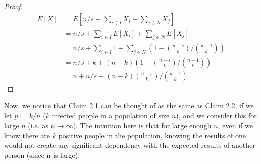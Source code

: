 \documentclass[12pt]{article}
\begin{document}
\begin{proof}
\begin{align*}
E[X]&=E[n/s + \sum\limits_{i \in I}^{}X_i + \sum\limits_{j \in N}^{}X_j] \\
    &= n/s + \sum\limits_{i \in I}^{}E[X_i] + \sum\limits_{j \in N}^{}E[X_j] \\
    &= n/s + \sum\limits_{i \in I}^{}{1} + \sum\limits_{j \in N}^{}{(1-{n-s\choose k}/{n-1 \choose k})} \\
    &= n/s + k + (n-k){(1-{n-s\choose k}/{n-1 \choose k})} \\
    &= n+n/s + (n-k){{n-s\choose k}/{n-1 \choose k}}
\end{align*}     
 


\end{proof}

Now, we notice that Claim 2.1 can be thought of as the same as Claim 2.2, if we let $p:=k/n$ ($k$ infected people in a population of size $n$), and we consider this for large $n$ (i.e. as $n \to \infty$). The intuition here is that for large enough $n$, even if we know there are $k$ positive people in the population, knowing the results of one would not create any significant dependency with the expected results of another person (since n is large).
\end{document}
